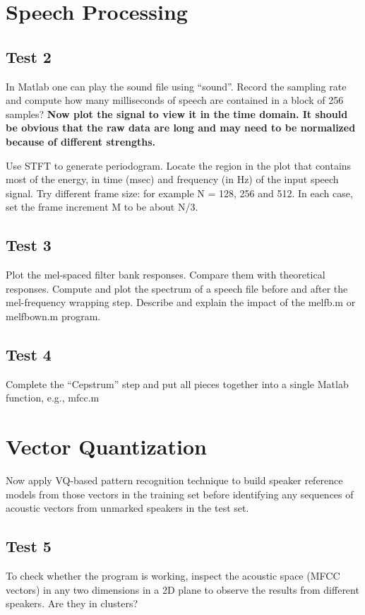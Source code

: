 \documentclass{article}
\begin{document}
\section{Speech Processing}

\subsection{Test 2}
In Matlab one can play the sound file using “sound”. Record the sampling rate and compute how
many milliseconds of speech are contained in a block of 256 samples? \textbf{Now plot the signal to view it in
the time domain. It should be obvious that the raw data are long and may need to be normalized
because of different strengths.}

Use STFT to generate periodogram. Locate the region in the plot that contains most of the energy, in time
(msec) and frequency (in Hz) of the input speech signal. Try different frame size: for example N = 128, 256
and 512. In each case, set the frame increment M to be about N/3.

\subsection{Test 3}
Plot the mel-spaced filter bank responses. Compare them with theoretical responses. Compute
and plot the spectrum of a speech file before and after the mel-frequency wrapping step. Describe and
explain the impact of the melfb.m or melfbown.m program.

\subsection{Test 4}
Complete the “Cepstrum” step and put all pieces together into a single Matlab function, e.g.,
mfcc.m

\section{Vector Quantization}
Now apply VQ-based pattern recognition technique to build speaker reference models from those vectors in
the training set before identifying any sequences of acoustic vectors from unmarked speakers in the test set.

\subsection{Test 5}
To check whether the program is working, inspect the acoustic space (MFCC vectors) in any two
dimensions in a 2D plane to observe the results from different speakers. Are they in clusters?
\end{document}
